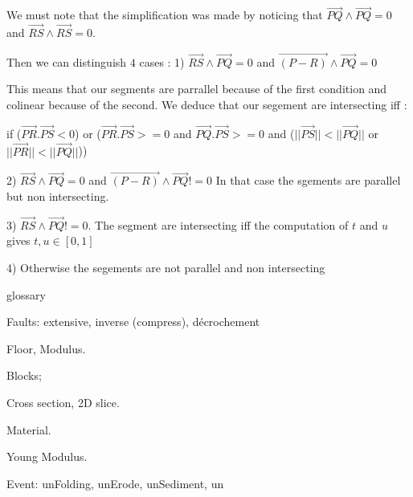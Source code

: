 \documentclass[12pt, a4paper]{memoir} %
\begin{document}
We must note that the simplification was made by noticing that $\overrightarrow{PQ} \wedge \overrightarrow{PQ} = 0$ and $\overrightarrow{RS} \wedge \overrightarrow{RS} = 0$.

Then we can distinguish $4$ cases :
1) $ \overrightarrow{RS} \wedge \overrightarrow{PQ} = 0$ and $\overrightarrow{(P - R)} \wedge \overrightarrow{PQ} = 0$

This means that our segments are parrallel because of the first condition and colinear because of the second. We deduce that our segement are intersecting 
iff :

if ($\overrightarrow{PR}.\overrightarrow{PS} < 0$) or ($\overrightarrow{PR}.\overrightarrow{PS} >= 0$ and $\overrightarrow{PQ}.\overrightarrow{PS} >= 0$ and ($||\overrightarrow{PS}|| < ||\overrightarrow{PQ}||$ or $||\overrightarrow{PR}|| < ||\overrightarrow{PQ}||$))

2)  $ \overrightarrow{RS} \wedge \overrightarrow{PQ} = 0$ and $\overrightarrow{(P - R)} \wedge \overrightarrow{PQ} != 0$
In that case the sgements are parallel but non intersecting.

3)  $ \overrightarrow{RS} \wedge \overrightarrow{PQ} != 0$.
The segment are intersecting iff the computation of $t$ and $u$ gives $t,u \in [0,1]$

4) Otherwise the segements are not parallel and non intersecting


glossary
	
Faults: extensive, inverse (compress), décrochement

Floor, Modulus.

Blocks;

Cross section, 2D slice.

Material.

Young Modulus.

Event: unFolding, unErode, unSediment, un



\end{document}

